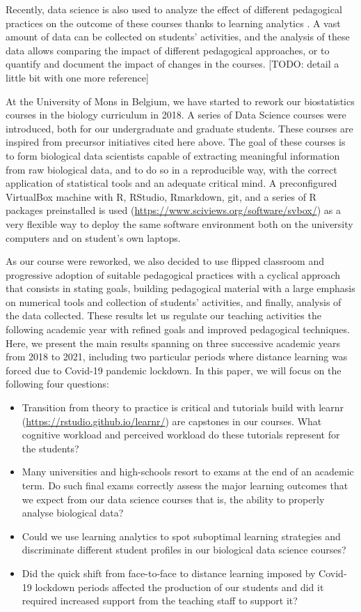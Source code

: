 \documentclass{aims}
\theoremstyle{definition}
\begin{document}
Recently, data science is also used to analyze the effect of different
pedagogical practices on the outcome of these courses thanks to learning
analytics \cite{Estrellado2020}. A vast amount of data can be collected
on students' activities, and the analysis of these data allows comparing
the impact of different pedagogical approaches, or to quantify and
document the impact of changes in the courses. {[}TODO: detail a little
bit with one more reference{]}

At the University of Mons in Belgium, we have started to rework our
biostatistics courses in the biology curriculum in 2018. A series of
Data Science courses were introduced, both for our undergraduate and
graduate students. These courses are inspired from precursor initiatives
cited here above. The goal of these courses is to form biological data
scientists capable of extracting meaningful information from raw
biological data, and to do so in a reproducible way, with the correct
application of statistical tools and an adequate critical mind. A
preconfigured VirtualBox machine with R, RStudio, Rmarkdown, git, and a
series of R packages preinstalled is used
(\url{https://www.sciviews.org/software/svbox/}) as a very flexible way
to deploy the same software environment both on the university computers
and on student's own laptops.

As our course were reworked, we also decided to use flipped classroom
and progressive adoption of suitable pedagogical practices with a
cyclical approach that consists in stating goals, building pedagogical
material with a large emphasis on numerical tools and collection of
students' activities, and finally, analysis of the data collected. These
results let us regulate our teaching activities the following academic
year with refined goals and improved pedagogical techniques. Here, we
present the main results spanning on three successive academic years
from 2018 to 2021, including two particular periods where distance
learning was forced due to Covid-19 pandemic lockdown. In this paper, we
will focus on the following four questions:

\begin{itemize}
\item
  Transition from theory to practice is critical and tutorials build
  with learnr (\url{https://rstudio.github.io/learnr/}) are capstones in
  our courses. What cognitive workload and perceived workload do these
  tutorials represent for the students?
\item
  Many universities and high-schools resort to exams at the end of an
  academic term. Do such final exams correctly assess the major learning
  outcomes that we expect from our data science courses that is, the
  ability to properly analyse biological data?
\item
  Could we use learning analytics to spot suboptimal learning strategies
  and discriminate different student profiles in our biological data
  science courses?
\item
  Did the quick shift from face-to-face to distance learning imposed by
  Covid-19 lockdown periods affected the production of our students and
  did it required increased support from the teaching staff to support
  it?
\end{itemize}
\end{document}
